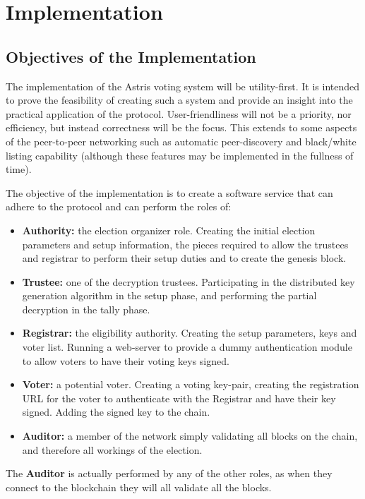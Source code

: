 
\chapter{Implementation}
\label{ch:sw}

\section{Objectives of the Implementation}
\label{ch:sw:objectives}

The implementation of the Astris voting system will be utility-first. It is intended to prove the feasibility of creating such a system and provide an insight into the practical application of the protocol. User-friendliness will not be a priority, nor efficiency, but instead correctness will be the focus. This extends to some aspects of the peer-to-peer networking such as automatic peer-discovery and black/white listing capability (although these features may be implemented in the fullness of time).

The objective of the implementation is to create a software service that can adhere to the protocol and can perform the roles of:

\begin{itemize}
    \item \textbf{Authority:} the election organizer role. Creating the initial election parameters and setup information, the pieces required to allow the trustees and registrar to perform their setup duties and to create the genesis block.
    \item \textbf{Trustee:} one of the decryption trustees. Participating in the distributed key generation algorithm in the setup phase, and performing the partial decryption in the tally phase.
    \item \textbf{Registrar:} the eligibility authority. Creating the setup parameters, keys and voter list. Running a web-server to provide a dummy authentication module to allow voters to have their voting keys signed.
    \item \textbf{Voter:} a potential voter. Creating a voting key-pair, creating the registration URL for the voter to authenticate with the Registrar and have their key signed. Adding the signed key to the chain.
    \item \textbf{Auditor:} a member of the network simply validating all blocks on the chain, and therefore all workings of the election.
\end{itemize}

The \textbf{Auditor} is actually performed by any of the other roles, as when they connect to the blockchain they will all validate all the blocks.

